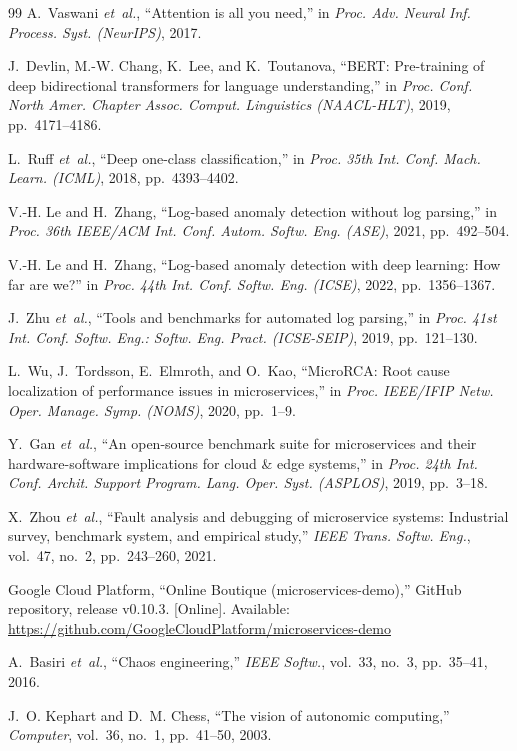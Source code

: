 \documentclass[journal]{IEEEtran}
\begin{document}
\begin{thebibliography}{99}
A.~Vaswani \emph{et~al.}, ``Attention is all you need,'' in \emph{Proc. Adv. Neural Inf. Process. Syst. (NeurIPS)}, 2017.

J.~Devlin, M.-W. Chang, K.~Lee, and K.~Toutanova, ``BERT: Pre-training of deep bidirectional transformers for language understanding,'' in \emph{Proc. Conf. North Amer. Chapter Assoc. Comput. Linguistics (NAACL-HLT)}, 2019, pp.~4171--4186.

L.~Ruff \emph{et~al.}, ``Deep one-class classification,'' in \emph{Proc. 35th Int. Conf. Mach. Learn. (ICML)}, 2018, pp.~4393--4402.

V.-H. Le and H.~Zhang, ``Log-based anomaly detection without log parsing,'' in \emph{Proc. 36th IEEE/ACM Int. Conf. Autom. Softw. Eng. (ASE)}, 2021, pp.~492--504.

V.-H. Le and H.~Zhang, ``Log-based anomaly detection with deep learning: How far are we?'' in \emph{Proc. 44th Int. Conf. Softw. Eng. (ICSE)}, 2022, pp.~1356--1367.

J.~Zhu \emph{et~al.}, ``Tools and benchmarks for automated log parsing,'' in \emph{Proc. 41st Int. Conf. Softw. Eng.: Softw. Eng. Pract. (ICSE-SEIP)}, 2019, pp.~121--130.

L.~Wu, J.~Tordsson, E.~Elmroth, and O.~Kao, ``MicroRCA: Root cause localization of performance issues in microservices,'' in \emph{Proc. IEEE/IFIP Netw. Oper. Manage. Symp. (NOMS)}, 2020, pp.~1--9.

Y.~Gan \emph{et~al.}, ``An open-source benchmark suite for microservices and their hardware-software implications for cloud \& edge systems,'' in \emph{Proc. 24th Int. Conf. Archit. Support Program. Lang. Oper. Syst. (ASPLOS)}, 2019, pp.~3--18.

X.~Zhou \emph{et~al.}, ``Fault analysis and debugging of microservice systems: Industrial survey, benchmark system, and empirical study,'' \emph{IEEE Trans. Softw. Eng.}, vol.~47, no.~2, pp.~243--260, 2021.

Google Cloud Platform, ``Online Boutique (microservices-demo),'' GitHub repository, release v0.10.3. [Online]. Available: \url{https://github.com/GoogleCloudPlatform/microservices-demo}

A.~Basiri \emph{et~al.}, ``Chaos engineering,'' \emph{IEEE Softw.}, vol.~33, no.~3, pp.~35--41, 2016.

J.~O. Kephart and D.~M. Chess, ``The vision of autonomic computing,'' \emph{Computer}, vol.~36, no.~1, pp.~41--50, 2003.


\end{thebibliography}
\end{document}
